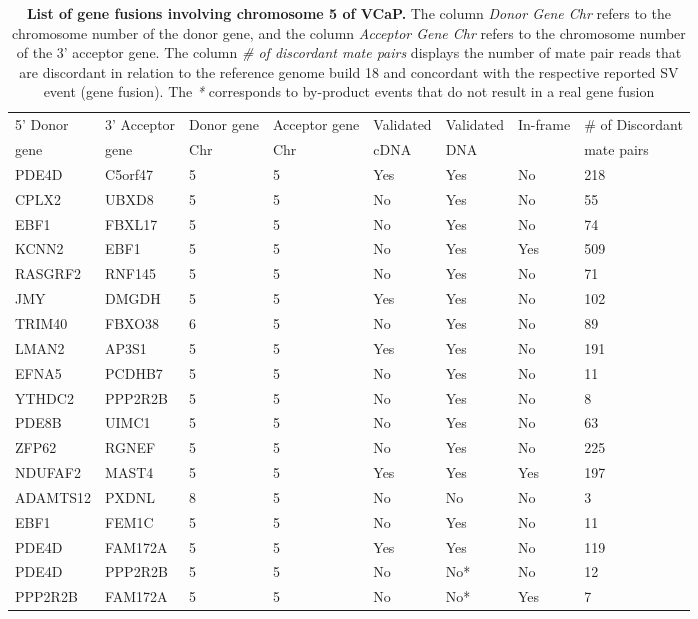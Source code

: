 \begin{table}[t!]
\begin{tabular}{llllllll}
\toprule
5' Donor & 3' Acceptor & Donor gene & Acceptor gene & Validated & Validated & In-frame & \# of Discordant  \\
gene & gene & Chr & Chr & cDNA & DNA & & mate pairs \\
\midrule
PDE4D & C5orf47 & 5 & 5 & Yes & Yes & No & 218 \\
CPLX2 & UBXD8 & 5 & 5 & No & Yes & No & 55 \\
EBF1 & FBXL17 & 5 & 5 & No & Yes & No & 74 \\
KCNN2 & EBF1 & 5 & 5 & No & Yes & Yes & 509 \\
RASGRF2 & RNF145 & 5 & 5 & No & Yes & No & 71 \\
JMY & DMGDH & 5 & 5 & Yes & Yes & No & 102 \\
TRIM40 & FBXO38 & 6 & 5 & No & Yes & No & 89 \\
LMAN2 & AP3S1 & 5 & 5 & Yes & Yes & No & 191 \\
EFNA5 & PCDHB7 & 5 & 5 & No & Yes & No & 11 \\
YTHDC2 & PPP2R2B & 5 & 5 & No & Yes & No & 8 \\
PDE8B & UIMC1 & 5 & 5 & No & Yes & No & 63 \\
ZFP62 & RGNEF & 5 & 5 & No & Yes & No & 225 \\
NDUFAF2 & MAST4 & 5 & 5 & Yes & Yes & Yes & 197 \\
ADAMTS12 & PXDNL & 8 & 5 & No & No & No & 3 \\
EBF1 & FEM1C & 5 & 5 & No & Yes & No & 11 \\
PDE4D & FAM172A & 5 & 5 & Yes & Yes & No & 119 \\
PDE4D & PPP2R2B & 5 & 5 & No & No* & No & 12 \\
PPP2R2B & FAM172A & 5 & 5 & No & No* & Yes & 7 \\
\toprule
\end{tabular}

\caption{\textbf{List of gene fusions involving chromosome 5 of VCaP.} The column \textit{Donor Gene Chr} refers to the chromosome number of the donor gene, and the column \textit{Acceptor Gene Chr} refers to the chromosome number of the 3' acceptor gene. The column \textit{\# of discordant mate pairs} displays the number of mate pair reads that are discordant in relation to the reference genome build 18 and concordant with the respective reported SV event (gene fusion). The \textit{*} corresponds to by-product events that do not result in a real gene fusion}\label{table:fusions}
\end{table}



